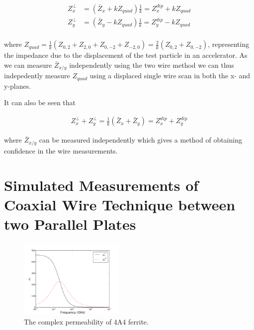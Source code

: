 \documentclass[review, number, sort&compress]{elsarticle}
\begin{document}
\begin{align}
Z^{\perp}_{x} & = \left( \bar{Z}_{x} + kZ_{quad} \right)\frac{1}{k} =  Z^{dip}_{x} + kZ_{quad}\\
Z^{\perp}_{y} & = \left( \bar{Z}_{y} - kZ_{quad} \right)\frac{1}{k}= Z^{dip}_{y} - kZ_{quad} \\
\end{align}

where $Z_{quad}=\frac{1}{k}\left( Z_{0,2}+Z_{2,0}+Z_{0,-2}+Z_{-2,0}  \right) = \frac{2}{k}\left( Z_{0,2}+Z_{0,-2}  \right)$, representing the impedance due to the displacement of the test particle in an accelerator. As we can measure $\bar{Z}_{x/y}$ independently using the two wire method we can thus indepedently measure $Z_{quad}$ using a displaced single wire scan in both the x- and y-planes.

It can also be seen that

\begin{align}
Z^{\perp}_{x} + Z^{\perp}_{y} = \frac{1}{k}\left( \bar{Z}_{x} + \bar{Z}_{y} \right) = Z^{dip}_{x} + Z^{dip}_{y}
\end{align}

where $\bar{Z}_{x/y}$ can be measured independently which gives a method of obtaining confidence in the wire measurements.



\section{Simulated Measurements of Coaxial Wire Technique between two Parallel Plates}
\label{sec:TopBotSymSims}

\begin{figure}
\begin{center}
\includegraphics[width=0.45\textwidth]{figures/4A4FerrMu.pdf}
\end{center}
\caption{The complex permeability of 4A4 ferrite.}
\label{fig:4a4permeability}
\end{figure}
\end{document}
